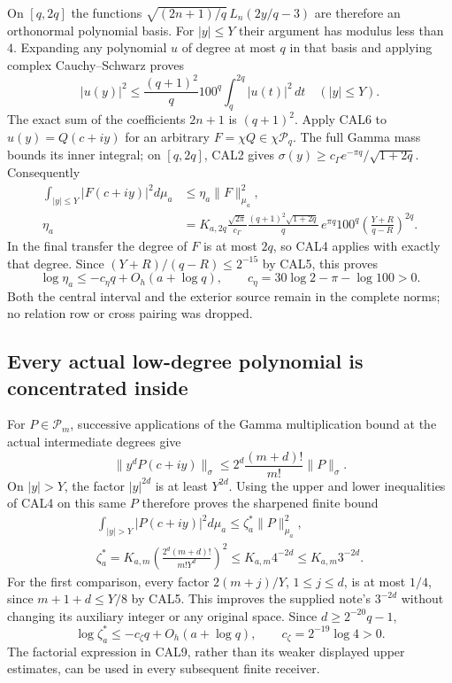 \documentclass[11pt,a4paper]{article}
\begin{document}
On $[q,2q]$ the functions
$\sqrt{(2n+1)/q}\,L_n(2y/q-3)$ are therefore an orthonormal
polynomial basis. For $|y|\le Y$ their argument has modulus less
than $4$. Expanding any polynomial $u$ of degree at most $q$ in
that basis and applying complex Cauchy--Schwarz proves
\[
 |u(y)|^2\le\frac{(q+1)^2}{q}100^q
                        \int_q^{2q}|u(t)|^2\,dt\quad(|y|\le Y).
 \tag{CAL6}
\]
The exact sum of the coefficients $2n+1$ is $(q+1)^2$.
Apply CAL6 to $u(y)=Q(c+iy)$ for an arbitrary
$F=\chi Q\in\chi\mathcal P_q$. The full Gamma mass bounds its
inner integral; on $[q,2q]$, CAL2 gives
$\sigma(y)\ge c_\Gamma e^{-\pi q}/\sqrt{1+2q}$.
Consequently
\[
 \begin{split}
 \int_{|y|\le Y}|F(c+iy)|^2d\mu_a
       &\le\eta_a\|F\|_{\mu_a}^2,\\
 \eta_a&=K_{a,2q}\frac{\sqrt{2\pi}}{c_\Gamma}
      \frac{(q+1)^2\sqrt{1+2q}}q\,
       e^{\pi q}100^q
       \left(\frac{Y+R}{q-R}\right)^{2q}.
 \end{split}                                                     \tag{CAL7}
\]
In the final transfer the degree of $F$ is at most $2q$, so
CAL4 applies with exactly that degree. Since
$(Y+R)/(q-R)\le2^{-15}$ by CAL5, this proves
\[
 \log\eta_a\le
  -c_\eta q+O_h(a+\log q),\qquad
 c_\eta=30\log2-\pi-\log100>0.
 \tag{CAL8}
\]
Both the central interval and the exterior source remain in the
complete norms; no relation row or cross pairing was dropped.

\subsection{Every actual low-degree polynomial is concentrated inside}

For $P\in\mathcal P_m$, successive applications of the Gamma
multiplication bound at the actual intermediate degrees give
\[
 \|y^d P(c+iy)\|_\sigma
 \le 2^d\frac{(m+d)!}{m!}\|P\|_\sigma.
\]
On $|y|>Y$, the factor $|y|^{2d}$ is at least $Y^{2d}$.
Using the upper and lower inequalities of CAL4 on this same
$P$ therefore proves the sharpened finite bound
\[
 \begin{gathered}
 \int_{|y|>Y}|P(c+iy)|^2d\mu_a\le\zeta_a^*\|P\|_{\mu_a}^2,\\
 \zeta_a^*=K_{a,m}
       \left(\frac{2^d(m+d)!}{m!Y^d}\right)^2
       \le K_{a,m}4^{-2d}\le K_{a,m}3^{-2d}.
 \end{gathered}                                                   \tag{CAL9}
\]
For the first comparison, every factor
$2(m+j)/Y$, $1\le j\le d$, is at most $1/4$, since
$m+1+d\le Y/8$ by CAL5. This improves the supplied note's
$3^{-2d}$ without changing its auxiliary integer or any original
space. Since $d\ge2^{-20}q-1$,
\[
 \log\zeta_a^*\le
       -c_\zeta q+O_h(a+\log q),\qquad
 c_\zeta=2^{-19}\log4>0.
 \tag{CAL10}
\]
The factorial expression in CAL9, rather than its weaker displayed
upper estimates, can be used in every subsequent finite receiver.
\end{document}
